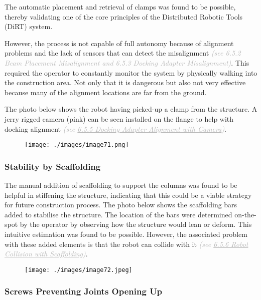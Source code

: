 The automatic placement and retrieval of clamps was found to be possible, thereby validating one of the core principles of the Distributed Robotic Tools (DiRT) system. 

However, the process is not capable of full autonomy because of alignment problems and the lack of sensors that can detect the misalignment \textit{\textcolor[HTML]{B7B7B7}{(see 6.5.2 Beam Placement Misalignment and 6.5.3 Docking Adapter Misalignment)}}. This required the operator to constantly monitor the system by physically walking into the construction area. Not only that it is dangerous but also not very effective because many of the alignment locations are far from the ground. 

The photo below shows the robot having picked-up a clamp from the structure. A jerry rigged camera (pink) can be seen installed on the flange to help with docking alignment \textit{\textcolor[HTML]{B7B7B7}{(see \uline{6.5.5 Docking Adapter Alignment with Camera})}}. 

\begin{figure}[H]
\texttt{[image: ./images/image71.png]}
\end{figure}


\subsubsection{Stability by Scaffolding}

The manual addition of scaffolding to support the columns was found to be helpful in stiffening the structure, indicating that this could be a viable strategy for future construction process. The photo below shows the scaffolding bars added to stabilise the structure. The location of the bars were determined on-the-spot by the operator by observing how the structure would lean or deform. This intuitive estimation was found to be possible. However, the associated problem with these added elements is that the robot can collide with it \textit{\textcolor[HTML]{B7B7B7}{(see \uline{6.5.6 Robot Collision with Scaffolding})}}.

\begin{figure}[H]
\texttt{[image: ./images/image72.jpeg]}
\end{figure}


\subsubsection{Screws Preventing Joints Opening Up}

